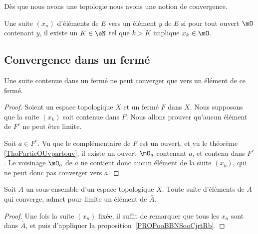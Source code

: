 Dès que nous avons une topologie nous avons une notion de convergence.
\begin{definition} \label{DefXSnbhZX}
    Une suite $(x_n)$ d'éléments de $E$  vers un élément $y$ de $E$ si pour tout ouvert $\mO$ contenant $y$, il existe un $K\in \eN$ tel que $k>K$ implique $x_k\in\mO$.
\end{definition}

\subsection{Convergence dans un fermé}

\begin{proposition}      \label{PROPooBBNSooCjrtRb}
    Une suite contenue dans un fermé ne peut converger que vers un élément de ce fermé.
\end{proposition}

\begin{proof}
    Soient un espace topologique \( X\) et un fermé \( F\) dans \( X\). Nous supposons que la suite \( (x_k)\) soit contenue dans \( F\). Nous allons prouver qu'aucun élément de \( F^c\) ne peut être limite.

    Soit \( a \in F^c\). Vu que le complémentaire de \( F\) est un ouvert, et vu le théorème \ref{ThoPartieOUvpartouv}, il existe un ouvert \( \mO_a\) contenant \( a\), et contenu dans \( F^c\). Le voisinage \( \mO_a\) de \( a\) ne contient donc aucun élément de la suite \( (x_k)\), qui ne peut donc pas converger vers \( a\).
\end{proof}

\begin{corollary}\label{CorLimAbarA}
  Soit \( A \) un sous-ensemble d'un espace topologique \(X \). Toute suite d'éléments de \(A \) qui converge, admet pour limite un élément de \( \bar A \).
\end{corollary}
\begin{proof}
  Une fois la suite \( (x_n) \) fixée, il suffit de remarquer que tous les \( x_n \) sont dans \( \bar A \), et puis d'appliquer la proposition~\ref{PROPooBBNSooCjrtRb}. 
\end{proof}


